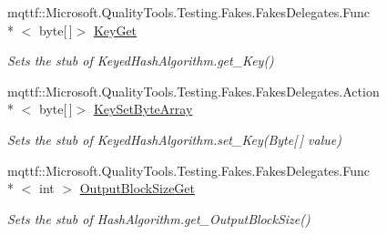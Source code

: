 \begin{DoxyCompactItemize}
mqttf\-::\-Microsoft.\-Quality\-Tools.\-Testing.\-Fakes.\-Fakes\-Delegates.\-Func\\*
$<$ byte\mbox{[}$\,$\mbox{]}$>$ \hyperlink{class_system_1_1_security_1_1_cryptography_1_1_fakes_1_1_stub_keyed_hash_algorithm_a518cece66c583e2955ffbfde52fbaea1}{Key\-Get}
\begin{DoxyCompactList}\small\item\em Sets the stub of Keyed\-Hash\-Algorithm.\-get\-\_\-\-Key()\end{DoxyCompactList}\item 
mqttf\-::\-Microsoft.\-Quality\-Tools.\-Testing.\-Fakes.\-Fakes\-Delegates.\-Action\\*
$<$ byte\mbox{[}$\,$\mbox{]}$>$ \hyperlink{class_system_1_1_security_1_1_cryptography_1_1_fakes_1_1_stub_keyed_hash_algorithm_a0544b16938d5f7d61589fe183bdb2d80}{Key\-Set\-Byte\-Array}
\begin{DoxyCompactList}\small\item\em Sets the stub of Keyed\-Hash\-Algorithm.\-set\-\_\-\-Key(\-Byte\mbox{[}$\,$\mbox{]} value)\end{DoxyCompactList}\item 
mqttf\-::\-Microsoft.\-Quality\-Tools.\-Testing.\-Fakes.\-Fakes\-Delegates.\-Func\\*
$<$ int $>$ \hyperlink{class_system_1_1_security_1_1_cryptography_1_1_fakes_1_1_stub_keyed_hash_algorithm_a6aafcb6e00dea77de46c0b1fef0e3caa}{Output\-Block\-Size\-Get}
\begin{DoxyCompactList}\small\item\em Sets the stub of Hash\-Algorithm.\-get\-\_\-\-Output\-Block\-Size()\end{DoxyCompactList}\end{DoxyCompactItemize}
